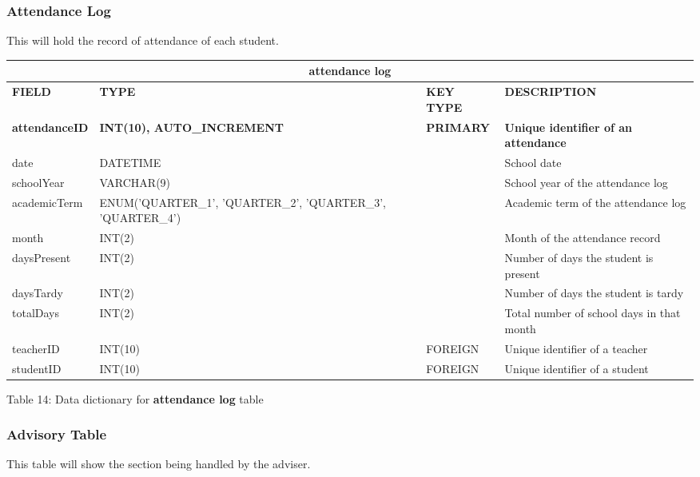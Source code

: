 \documentclass[11pt,a4paper,titlepage]{article}
\begin{document}
\subsubsection{Attendance Log}

This will hold the record of attendance of each student.

\vspace{1cm}
\begin{longtable}{ |p{2.5cm}|p{4.5cm}|p{2.5cm}|p{3cm}|  }
    \hline
    \multicolumn{4}{|c|}{\textbf{attendance log}} \\
    \hline
    \textbf{FIELD}&\textbf{TYPE}&\textbf{KEY TYPE}&\textbf{DESCRIPTION}\\
    \hline
    \textbf{attendanceID}  & \textbf{INT(10), AUTO\_INCREMENT} & \textbf{PRIMARY} & \textbf{Unique identifier of an attendance}\\ \hline
    date   & DATETIME   & & School date\\ \hline
    schoolYear   & VARCHAR(9)   & & School year of the attendance log\\ \hline
    academicTerm   & ENUM('QUARTER\_1', 'QUARTER\_2', 'QUARTER\_3', 'QUARTER\_4') &  & Academic term of the attendance log\\ \hline
    month   & INT(2) &  & Month of the attendance record\\ \hline
    daysPresent   & INT(2) &  & Number of days the student is present\\ \hline
    daysTardy   & INT(2) &  & Number of days the student is tardy\\ \hline
    totalDays   & INT(2) &  & Total number of school days in that month\\ \hline
    teacherID   & INT(10)   & FOREIGN & Unique identifier of a teacher\\ \hline
    studentID   & INT(10)   & FOREIGN & Unique identifier of a student\\ \hline
\end{longtable}

\vspace{.5cm}
\begin{center}
    Table 14: Data dictionary for \textbf{attendance log} table
\end{center}


\subsubsection{Advisory Table}

This table will show the section being handled by the adviser.
\end{document}
